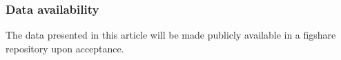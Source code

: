 \documentclass[9pt,twocolumn,twoside]{pnas-new}
\begin{document}
\subsubsection*{Data availability} The data presented in this article will be made publicly available in a figshare repository upon acceptance.


\end{document}
